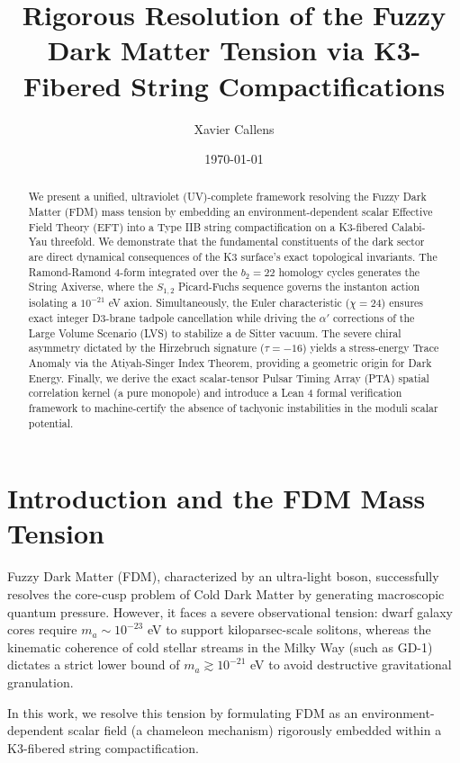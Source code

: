 \documentclass[11pt,a4paper]{article}
\title{\textbf{Rigorous Resolution of the Fuzzy Dark Matter Tension via K3-Fibered String Compactifications}}
\author[1]{Xavier Callens}
\affil[1]{SocrateAI Open Lab, Independent Research Node, France}
\date{\today}
\begin{document}
\maketitle

\begin{abstract}
We present a unified, ultraviolet (UV)-complete framework resolving the Fuzzy Dark Matter (FDM) mass tension by embedding an environment-dependent scalar Effective Field Theory (EFT) into a Type IIB string compactification on a K3-fibered Calabi-Yau threefold. We demonstrate that the fundamental constituents of the dark sector are direct dynamical consequences of the K3 surface's exact topological invariants. The Ramond-Ramond 4-form integrated over the $b_2=22$ homology cycles generates the String Axiverse, where the $S_{1,2}$ Picard-Fuchs sequence governs the instanton action isolating a $10^{-21}$ eV axion. Simultaneously, the Euler characteristic ($\chi = 24$) ensures exact integer D3-brane tadpole cancellation while driving the $\alpha'$ corrections of the Large Volume Scenario (LVS) to stabilize a de Sitter vacuum. The severe chiral asymmetry dictated by the Hirzebruch signature ($\tau = -16$) yields a stress-energy Trace Anomaly via the Atiyah-Singer Index Theorem, providing a geometric origin for Dark Energy. Finally, we derive the exact scalar-tensor Pulsar Timing Array (PTA) spatial correlation kernel (a pure monopole) and introduce a Lean 4 formal verification framework to machine-certify the absence of tachyonic instabilities in the moduli scalar potential.
\end{abstract}

\section{Introduction and the FDM Mass Tension}
Fuzzy Dark Matter (FDM), characterized by an ultra-light boson, successfully resolves the core-cusp problem of Cold Dark Matter by generating macroscopic quantum pressure. However, it faces a severe observational tension: dwarf galaxy cores require $m_a \sim 10^{-23}$ eV to support kiloparsec-scale solitons, whereas the kinematic coherence of cold stellar streams in the Milky Way (such as GD-1) dictates a strict lower bound of $m_a \gtrsim 10^{-21}$ eV to avoid destructive gravitational granulation.

In this work, we resolve this tension by formulating FDM as an environment-dependent scalar field (a chameleon mechanism) rigorously embedded within a K3-fibered string compactification. 
\end{document}
